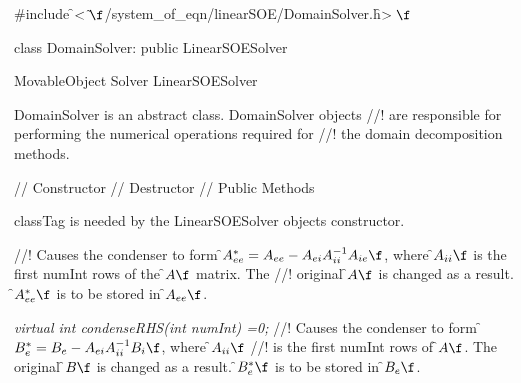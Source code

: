 
\indent \#include \f$<\tilde{ }\f$/system\_of\_eqn/linearSOE/DomainSolver.h\f$>\f$

\indent class DomainSolver: public LinearSOESolver

\indent  MovableObject
\indent\indent  Solver
\indent\indent\indent  LinearSOESolver
\indent\indent\indent{}

\indent DomainSolver is an abstract class. DomainSolver objects
//! are responsible for performing the numerical operations required for
//! the domain decomposition methods.

\indent\indent // Constructor
\indent{}
\indent\indent // Destructor
\indent{}
\indent\indent // Public Methods
\indent{}
\indent{}
\indent{}
\indent{}
\indent{}
\indent{}
\indent{}
\indent{}






\p classTag is needed by the LinearSOESolver objects constructor.


//! Causes the condenser to form \f$A_{ee}^* = A_{ee} -A_{ei} A_{ii}^{-1} A_{ie}\f$, where
\f$A_{ii}\f$ is the first \p numInt rows of the \f$A\f$ matrix.  The
//! original \f$A\f$ is changed as a result. \f$A_{ee}^*\f$ is to be stored in \f$A_{ee}\f$.

{\em virtual int condenseRHS(int numInt) =0;}
//! Causes the condenser to form \f$B_e^* = B_e - A_{ei} A_{ii}^{-1} B_i\f$, where \f$A_{ii}\f$ 
//! is the first \p numInt rows of \f$A\f$. The original \f$B\f$ is changed as a result. 
\f$B_e^*\f$ is to be stored in \f$B_e\f$.


